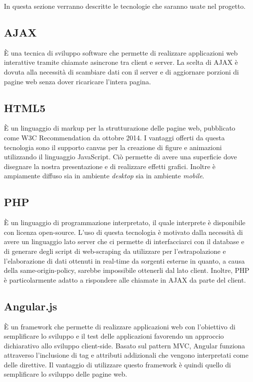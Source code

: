 In questa sezione verranno descritte le tecnologie che saranno usate nel progetto.

\subsection{AJAX}
È una tecnica di sviluppo software che permette di realizzare applicazioni web interattive tramite chiamate asincrone tra client e server.
La scelta di \gls{AJAX} è dovuta alla necessità di scambiare dati con il server e di aggiornare porzioni di pagine web senza dover ricaricare l'intera pagina.

\subsection{HTML5}
È un \gls{linguaggio di markup} per la strutturazione delle pagine web, pubblicato come \gls{W3C} Recommendation da ottobre 2014.
I vantaggi offerti da questa tecnologia sono il supporto canvas per la creazione di figure e animazioni utilizzando il linguaggio \gls{JavaScript}. Ciò permette di avere una superficie dove disegnare la nostra presentazione e di realizzare effetti grafici. Inoltre è ampiamente diffuso sia in ambiente \textit{desktop} sia in ambiente \textit{mobile}.

\subsection{PHP}
È un \gls{linguaggio di programmazione} interpretato, il quale interprete è disponibile con licenza open-source.
L'uso di questa tecnologia è motivato dalla necessità di avere un linguaggio lato server che ci permette di interfacciarci con il \gls{database} e di generare degli script di \gls{web-scraping} da utilizzare per l'estrapolazione e l'elaborazione di dati ottenuti in \gls{real-time} da sorgenti esterne in quanto, a causa della \gls{same-origin-policy}, sarebbe impossibile ottenerli dal lato client. Inoltre, \gls{PHP} è particolarmente adatto a rispondere alle chiamate in \gls{AJAX} da parte del client.

\subsection{Angular.js}
È un \gls{framework} che permette di realizzare applicazioni web con l'obiettivo di semplificare lo sviluppo e il test delle applicazioni favorendo un approccio dichiarativo allo sviluppo client-side. Basato sul pattern \gls{MVC}, \gls{Angular} funziona attraverso l'inclusione di tag e attributi addizionali che vengono interpretati come delle direttive.
Il vantaggio di utilizzare questo \gls{framework} è quindi quello di semplificare lo sviluppo delle pagine web.

